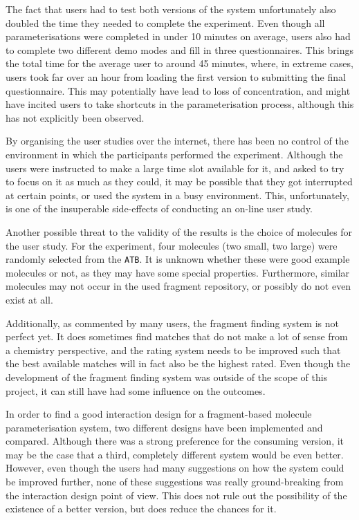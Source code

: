 The fact that users had to test both versions of the system unfortunately also doubled the time they needed to complete the experiment. Even though all parameterisations were completed in under 10 minutes on average, users also had to complete two different demo modes and fill in three questionnaires. This brings the total time for the average user to around 45 minutes, where, in extreme cases, users took far over an hour from loading the first version to submitting the final questionnaire. This may potentially have lead to loss of concentration, and might have incited users to take shortcuts in the parameterisation process, although this has not explicitly been observed.

By organising the user studies over the internet, there has been no control of the environment in which the participants performed the experiment. Although the users were instructed to make a large time slot available for it, and asked to try to focus on it as much as they could, it may be possible that they got interrupted at certain points, or used the system in a busy environment. This, unfortunately, is one of the insuperable side-effects of conducting an on-line user study.

Another possible threat to the validity of the results is the choice of molecules for the user study. For the experiment, four molecules (two small, two large) were randomly selected from the \verb|ATB|. It is unknown whether these were good example molecules or not, as they may have some special properties. Furthermore, similar molecules may not occur in the used fragment repository, or possibly do not even exist at all.

Additionally, as commented by many users, the fragment finding system is not perfect yet. It does sometimes find matches that do not make a lot of sense from a chemistry perspective, and the rating system needs to be improved such that the best available matches will in fact also be the highest rated. Even though the development of the fragment finding system was outside of the scope of this project, it can still have had some influence on the outcomes.

In order to find a good interaction design for a fragment-based molecule parameterisation system, two different designs have been implemented and compared. Although there was a strong preference for the consuming version, it may be the case that a third, completely different system would be even better. However, even though the users had many suggestions on how the system could be improved further, none of these suggestions was really ground-breaking from the interaction design point of view. This does not rule out the possibility of the existence of a better version, but does reduce the chances for it.

